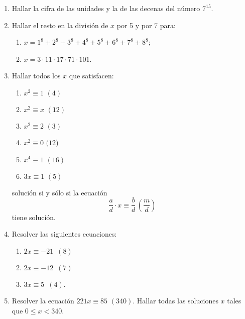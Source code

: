 \documentclass[a4paper,12pt,twoside,spanish,reqno]{amsbook}
\numberwithin{equation}{section}
\begin{document}
\begin{enumerate}
\item Hallar la cifra de las unidades y la de las decenas del n\'umero $7^{15}$.


\item Hallar el resto en la divisi\'on de $x$ por 5 y por 7 para:
 \begin{enumerate}
\item $x=1^8 + 2^8 + 3^8 + 4^8 + 5^8 + 6^8 + 7^8 + 8^8$;
\item $x=3\cdot 11\cdot 17\cdot 71\cdot 101$.
\end{enumerate}

\item Hallar todos los $x$ que satisfacen:
\begin{multicols}{3}
 \begin{enumerate}
  \item $x^2 \equiv 1\,\, (4)$
\item  $x^2 \equiv x\,\, (12)$
\item  $x^2 \equiv 2 \,\, (3)$
\item  $x^2 \equiv 0\,\, (12$)
\item  $x^4 \equiv 1 \,\, (16)$
\item  $3x \equiv 1\,\, (5)$
 \end{enumerate}
\end{multicols}

soluci\'on si y s\'olo si la ecuaci\'on
\[ \frac{a}{d}\cdot x \equiv \frac{b}{d}\,\left(\frac{m}{d}\right)\]
tiene soluci\'on.

\item Resolver las siguientes ecuaciones:
\begin{multicols}{3}
 \begin{enumerate}
  \item $2x \equiv -21 \,\,\, (8)$
\item $2x \equiv -12 \,\,\, (7)$
\item $3x \equiv 5\,\,\, (4)$.
 \end{enumerate}
\end{multicols}

\item Resolver la ecuaci\'on $221 x \equiv 85\,\, (340)$. Hallar todas las soluciones $x$ tales que $0 \le x < 340$.


\end{enumerate}
\end{document}
